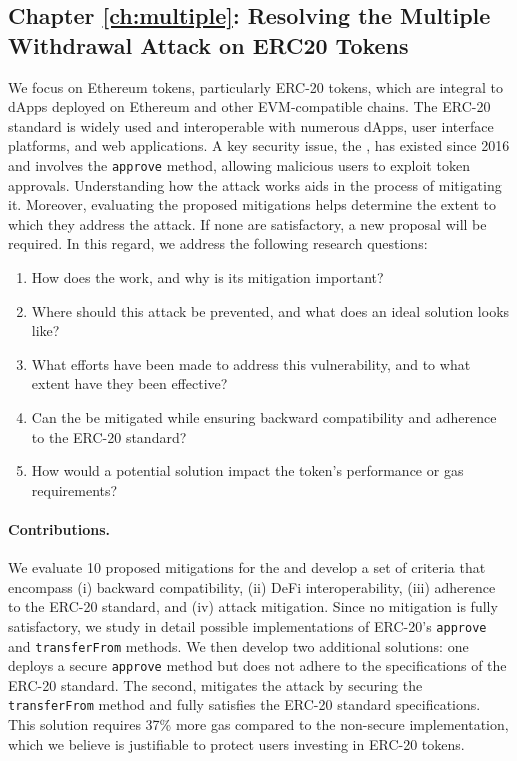 \subsection{Chapter \ref{ch:multiple}: Resolving the Multiple Withdrawal Attack on ERC20 Tokens}
We focus on Ethereum tokens, particularly ERC-20 tokens, which are integral to dApps deployed on Ethereum and other EVM-compatible chains. The ERC-20 standard is widely used and interoperable with numerous dApps, user interface platforms, and web applications. A key security issue, the \mwa, has existed since 2016 and involves the \texttt{approve} method, allowing malicious users to exploit token approvals. Understanding how the attack works aids in the process of mitigating it. Moreover, evaluating the proposed mitigations helps determine the extent to which they address the attack. If none are satisfactory, a new proposal will be required. In this regard, we address the following research questions:
\begin{enumerate}[label={(RQ3.\arabic*)},leftmargin=*]
	\item How does the \mwa work, and why is its mitigation important?
	\item Where should this attack be prevented, and what does an ideal solution looks like?
	\item What efforts have been made to address this vulnerability, and to what extent have they been effective?
	\item Can the \mwa be mitigated while ensuring backward compatibility and adherence to the ERC-20 standard?
	\item How would a potential solution impact the token's performance or gas requirements?
\end{enumerate}
\paragraph{Contributions.} We evaluate 10 proposed mitigations for the \mwa and develop a set of criteria that encompass (i) backward compatibility, (ii) DeFi interoperability, (iii) adherence to the ERC-20 standard, and (iv) attack mitigation. Since no mitigation is fully satisfactory, we study in detail possible implementations of ERC-20's \texttt{approve} and \texttt{transferFrom} methods. We then develop two additional solutions: one deploys a secure \texttt{approve} method but does not adhere to the specifications of the ERC-20 standard. The second, mitigates the attack by securing the \texttt{transferFrom} method and fully satisfies the ERC-20 standard specifications. This solution requires 37\% more gas compared to the non-secure implementation, which we believe is justifiable to protect users investing in ERC-20 tokens.


